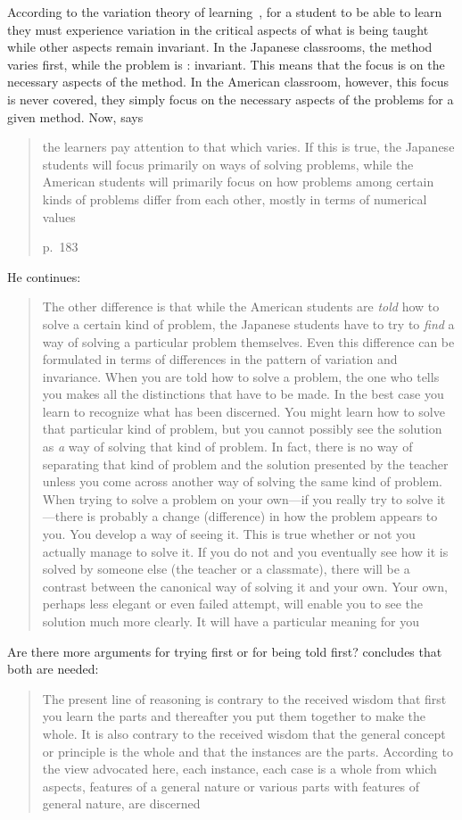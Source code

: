 According to the variation theory of
learning~\parencite[see \eg][Ch 3]{NecessaryConditionsOfLearning},
for a student to be able to learn they must experience variation in the 
critical aspects of what is being taught while other aspects remain invariant.
In the Japanese classrooms, the method varies first, while the problem is :
invariant.
This means that the focus is on the necessary aspects of the method.
In the American classroom, however, this focus is never covered, they simply 
focus on the necessary aspects of the problems for a given method.
Now, \textcite{NecessaryConditionsOfLearning} says \blockquote[p.~183][.]{%
  the learners pay attention to that which varies. If this is true, the 
  Japanese students will focus primarily on ways of solving problems, while the
  American students will primarily focus on how problems among certain kinds of
  problems differ from each other, mostly in terms of numerical values%
}
He continues: \blockquote[{\cite[p.~183, original 
emphasis]{NecessaryConditionsOfLearning}}][.]{%
  The other difference is that while the American students are \emph{told} how 
  to solve a certain kind of problem, the Japanese students have to try to 
  \emph{find} a way of solving a particular problem themselves. Even this 
  difference can be formulated in terms of differences in the pattern of 
  variation and invariance. When you are told how to solve a problem, the one 
  who tells you makes all the distinctions that have to be made. In the best 
  case you learn to recognize what has been discerned. You might learn how to 
  solve that particular kind of problem, but you cannot possibly see the 
  solution as \emph{a} way of solving that kind of problem.
  In fact, there is no way of separating that kind of problem and the solution 
  presented by the teacher unless you come across another way of solving the 
  same kind of problem. When trying to solve a problem on your own---if you 
  really try to solve it---there is probably a change (difference) in how the 
  problem appears to you.
  You develop a way of seeing it. This is true whether or not you actually 
  manage to solve it. If you do not and you eventually see how it is solved by 
  someone else (the teacher or a classmate), there will be a contrast between 
  the canonical way of solving it and your own. Your own, perhaps less elegant 
  or even failed attempt, will enable you to see the solution much more 
  clearly. It will have a particular meaning for you%
}

Are there more arguments for trying first or for being told first?
\Textcite[p.~214]{NecessaryConditionsOfLearning} concludes that both are 
needed:
\blockquote{%
  The present line of reasoning is contrary to the received wisdom that first 
  you learn the parts and thereafter you put them together to make the whole. 
  It is also contrary to the received wisdom that the general concept or 
  principle is the whole and that the instances are the parts. According to the 
  view advocated here, each instance, each case is a whole from which aspects, 
  features of a general nature or various parts with features of general 
  nature, are discerned%
}.

